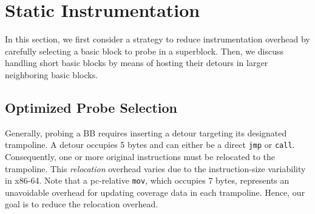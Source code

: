 {%

\maketitle














\appendix
%
%
%
%






\section{Static Instrumentation}
\label{sec:instrumentation}
In this section, we first consider a strategy to reduce instrumentation overhead by carefully selecting a basic block to probe in a superblock.
Then, we discuss handling short basic blocks by means of hosting their detours in larger neighboring basic blocks.

\subsection{Optimized Probe Selection}
\label{sec:optimized-probe}


Generally, probing a BB requires inserting a detour targeting its designated trampoline.
A detour occupies 5 bytes and can either be a direct \texttt{jmp} or \texttt{call}.
Consequently, one or more original instructions must be relocated to the trampoline.
This \textit{relocation} overhead varies due to the instruction-size variability in x86-64.
Note that a pc-relative \texttt{mov}, which occupies 7 bytes, represents an unavoidable
overhead for updating coverage data in each trampoline.
Hence, our goal is to reduce the relocation overhead.

}
